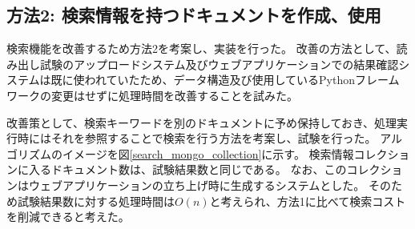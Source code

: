 
\clearpage
\subsection{方法2: 検索情報を持つドキュメントを作成、使用}

検索機能を改善するため方法2を考案し、実装を行った。
改善の方法として、読み出し試験のアップロードシステム及びウェブアプリケーションでの結果確認システムは既に使われていたため、データ構造及び使用しているPythonフレームワークの変更はせずに処理時間を改善することを試みた。

改善策として、検索キーワードを別のドキュメントに予め保持しておき、処理実行時にはそれを参照することで検索を行う方法を考案し、試験を行った。
アルゴリズムのイメージを図\ref{search_mongo_collection}に示す。
検索情報コレクションに入るドキュメント数は、試験結果数と同じである。
なお、このコレクションはウェブアプリケーションの立ち上げ時に生成するシステムとした。
そのため試験結果数に対する処理時間は$O(n)$と考えられ、方法1に比べて検索コストを削減できると考えた。

